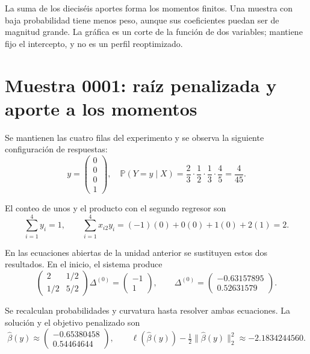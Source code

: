 \documentclass[11pt,a4paper]{article}
\newcommand{\Prob}{\mathbb P}
\begin{document}
La suma de los dieciséis aportes forma los momentos finitos.
Una muestra con baja probabilidad tiene menos peso,
aunque sus coeficientes puedan ser de magnitud grande.
La gráfica es un corte de la función de dos variables;
mantiene fijo el intercepto, y no es un perfil reoptimizado.
\endgroup

\clearpage
\section{Muestra 0001: raíz penalizada y aporte a los momentos}\label{logit126}
\begingroup\small
\setlength{\abovedisplayskip}{4pt}\setlength{\belowdisplayskip}{4pt}
Se mantienen las cuatro filas del experimento y se observa
la siguiente configuración de respuestas:
\[
y=\begin{pmatrix}0\\0\\0\\1\end{pmatrix},\quad \Prob(Y=y\mid X)=\frac{2}{3}\cdot\frac{1}{2}\cdot\frac{1}{3}\cdot\frac{4}{5}=\frac{4}{45}.
\]

El conteo de unos y el producto con el segundo regresor son
\[
\sum_{i=1}^4 y_i=1,\qquad\sum_{i=1}^4x_{i2}y_i=(-1)(0)+0(0)+1(0)+2(1)=2.
\]

En las ecuaciones abiertas de la unidad anterior se sustituyen
estos dos resultados. En el inicio, el sistema produce
\[
\begin{pmatrix}2&1/2\\1/2&5/2\end{pmatrix}\Delta^{(0)}=\begin{pmatrix}-1\\1\end{pmatrix},\qquad\Delta^{(0)}=\begin{pmatrix}-0.63157895\\0.52631579\end{pmatrix}.
\]

Se recalculan probabilidades y curvatura hasta resolver
ambas ecuaciones. La solución y el objetivo penalizado son
\[
\widehat\beta(y)\approx\begin{pmatrix}-0.65380458\\0.54464644\end{pmatrix},\qquad \ell(\widehat\beta(y))-\tfrac12\|\widehat\beta(y)\|_2^2\approx-2.1834244560.
\]
\end{document}
